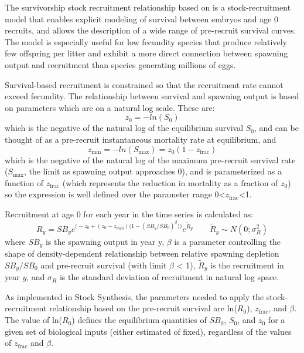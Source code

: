 \hypertarget{Survivorship}{}
The survivorship stock recruitment relationship based on \citet{taylor_stockrecruitment_2013} is a stock-recruitment model that enables explicit modeling of survival between embryos and age 0 recruits, and allows the description of a wide range of pre-recruit survival curves.  The model is especially useful for low fecundity species that produce relatively few offspring per litter and exhibit a more direct connection between spawning output and recruitment than species generating millions of eggs.

Survival-based recruitment is constrained so that the recruitment rate cannot exceed fecundity. The relationship between survival and spawning output is based on parameters which are on a natural log scale. These are:
\begin{equation}
z_0=-ln(S_0)
\end{equation} 
which is the negative of the natural log of the equilibrium survival $S_0$, and can be thought of as a pre-recruit instantaneous mortality rate at equilibrium, and
\begin{equation}
z_{\text{min}}=-ln(S_{\text{max}})=z_0(1-z_{\text{frac}})
\end{equation}
which is the negative of the natural log of the maximum pre-recruit survival rate ($S_{\text{max}}$, the limit as spawning output approaches 0), and is parameterized as a function of $z_{\text{frac}}$ (which represents the reduction in mortality as a fraction of $z_0$) so the expression is well defined over the parameter range 0<$z_{\text{frac}}$<1.

Recruitment at age 0 for each year in the time series is calculated as:
\begin{equation}{ R_y = SB_ye^{\Big(-z_0 + (z_0-z_{min})\big(1-(SB_y/SB_0)^\beta \big)\Big)}e^{\tilde{R}_y}\qquad  \tilde{R}_y\sim N(0;\sigma^2_R)}
\end{equation}
where $SB_y$ is the spawning output in year y,  $\beta$ is a parameter controlling the shape of density-dependent relationship between relative spawning depletion $SB_y/SB_0$ and pre-recruit survival (with limit $\beta$ < 1), $\tilde{R}_y$ is the recruitment in year $y$, and $\sigma_R$ is the standard deviation of recruitment in natural log space. 

As implemented in Stock Synthesis, the parameters needed to apply the stock-recruitment relationship based on the pre-recruit survival are ln($R_0$), $z_{\text{frac}}$, and $\beta$. The value of ln($R_0$) defines the equilibrium quantities of $SB_0$, $S_0$, and $z_0$ for a given set of biological inputs (either estimated of fixed), regardless of the values of $z_{\text{frac}}$ and $\beta$.

